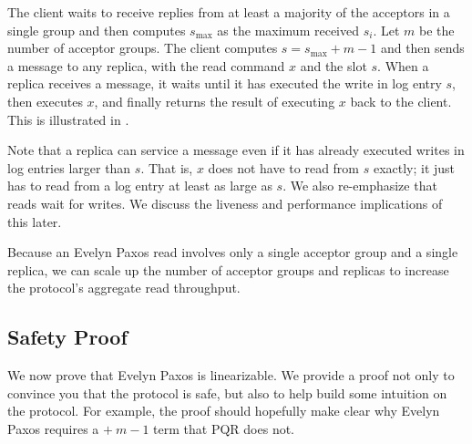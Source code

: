The client waits to receive  replies from at least a
majority of the acceptors in a single group and then computes $s_\text{max}$ as
the maximum received $s_i$. Let $m$ be the number of acceptor groups. The
client computes $s = s_\text{max} + m - 1$ and then sends a 
message to any replica, with the read command $x$ and the slot $s$.
%
When a replica receives a  message, it waits until it has
executed the write in log entry $s$, then executes $x$, and finally returns the
result of executing $x$ back to the client. This is illustrated in
.

Note that a replica can service a  message even if it has
already executed writes in log entries larger than $s$. That is, $x$ does not
have to read from $s$ exactly; it just has to read from a log entry at least as
large as $s$. We also re-emphasize that reads wait for writes. We discuss the
liveness and performance implications of this later.

{}

Because an Evelyn Paxos read involves only a single acceptor group and a single
replica, we can scale up the number of acceptor groups and replicas to increase
the protocol's aggregate read throughput.


\subsection{Safety Proof}
We now prove that Evelyn Paxos is linearizable. We provide a proof not only to
convince you that the protocol is safe, but also to help build some intuition
on the protocol. For example, the proof should hopefully make clear why Evelyn
Paxos requires a $+\ m - 1$ term that PQR does not.

